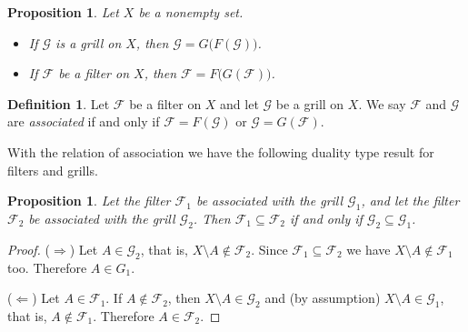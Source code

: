 \documentclass[12pt]{article}
\theoremstyle{plain}
\newtheorem{prop}[thm]{Proposition}
\theoremstyle{definition}
\newtheorem{defn}[thm]{Definition}
\newcommand{\calF}{\mathcal{F}}
\newcommand{\calG}{\mathcal{G}}
\begin{document}
\begin{prop}
  Let $X$ be a nonempty set.
  \begin{itemize}
    \item[(a)] If $\calG$ is a grill on $X$, then $\calG = G\bigl(F(\calG)\bigr)$.
    
    \item[(b)] If $\calF$ be a filter on $X$, then $\calF = F\bigl(G(\calF)\bigr)$.
  \end{itemize}
\end{prop}

\begin{defn}
  Let $\calF$ be a filter on $X$ and let $\calG$ be a grill on $X$.
  We say $\calF$ and $\calG$ are \textsl{associated} if and only if $\calF = F(\calG)$ or $\calG = G(\calF)$. 
\end{defn}

With the relation of association we have the following duality type result for filters and grills.

\begin{prop}
  Let the filter $\calF_1$ be associated with the grill $\calG_1$, and let the filter $\calF_2$ be associated with the grill $\calG_2$.
  Then $\calF_1 \subseteq \calF_2$ if and only if $\calG_2 \subseteq \calG_1$.
\end{prop}
\begin{proof}
  ($\Rightarrow$)
  Let $A \in \calG_2$, that is, $X \setminus A \not\in \calF_2$.
  Since $\calF_1 \subseteq \calF_2$ we have $X \setminus A \not\in \calF_1$ too.
  Therefore $A \in G_1$.

  ($\Leftarrow$)
  Let $A \in \calF_1$.
  If $A \not\in \calF_2$, then $X \setminus A \in \calG_2$ and (by assumption) $X \setminus A \in \calG_1$, that is, $A \not\in \calF_1$.
  Therefore $A \in \calF_2$.
\end{proof}
\end{document}

